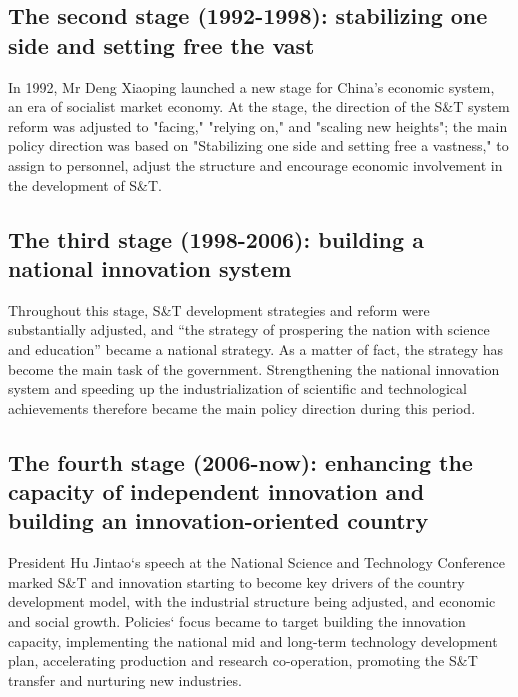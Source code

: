 \subsection{The second stage (1992-1998): stabilizing one side and setting free the vast}

In 1992, Mr Deng Xiaoping launched a new stage for China's economic system, an 
era of socialist market economy. At the stage, the direction of the S\&T system 
reform was adjusted to "facing," "relying on," and "scaling new heights"; the 
main policy direction was based on "Stabilizing one side and setting free a 
vastness," to assign to personnel, adjust the structure and encourage economic 
involvement in the development of S\&T.

\subsection{The third stage (1998-2006): building a national innovation system}

Throughout this stage, S\&T development strategies and reform were substantially 
adjusted, and “the strategy of prospering the nation with science and education” 
became a national strategy. As a matter of fact, the strategy has become the 
main task of the government. Strengthening the national innovation system and 
speeding up the industrialization of scientific and technological achievements 
therefore became the main policy direction during this period.

\subsection{The fourth stage (2006-now): enhancing the capacity of independent innovation and building an innovation-oriented country}

President Hu Jintao`s speech at the National Science and Technology Conference 
marked S\&T and innovation starting to become key drivers of the country 
development model, with the industrial structure being adjusted, and economic 
and social growth. Policies` focus became to target building the innovation 
capacity, implementing the national mid and long-term technology development 
plan, accelerating production and research co-operation, promoting the S\&T 
transfer and nurturing new industries.
